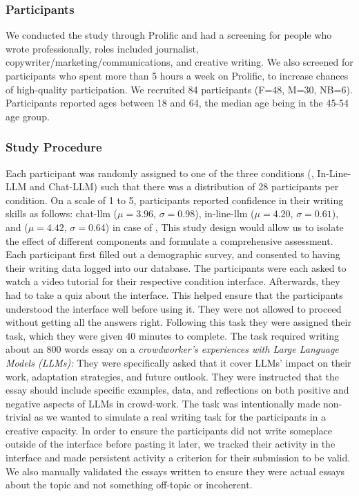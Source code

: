 \subsubsection{Participants}
We conducted the study through Prolific and had a screening for people who wrote professionally, roles included journalist, copywriter/marketing/communications, and creative writing. We also screened for participants who spent more than 5 hours a week on Prolific, to increase chances of high-quality participation. We recruited 84 participants (F=48, M=30, NB=6). Participants reported ages between 18 and 64, the median age being in the 45-54 age group. 

\subsubsection{Study Procedure}
Each participant was randomly assigned to one of the three conditions (\system, In-Line-LLM and Chat-LLM) such that there was a distribution of 28 participants per condition.  On a scale of 1 to 5, participants reported confidence in their writing skills as follows: chat-llm ($\mu = 3.96$, $\sigma = 0.98$), in-line-llm ($\mu = 4.20$, $\sigma = 0.61$), and \system ($\mu = 4.42$, $\sigma = 0.64$) in case of \system, This study design would allow us to isolate the effect of different components and formulate a comprehensive assessment. Each participant first filled out a demographic survey, and consented to having their writing data logged into our database. The participants were each asked to watch a video tutorial for their respective condition interface. Afterwards,  they had to take a quiz about the interface. This helped ensure that the participants understood the interface well before using it. They were not allowed to proceed without getting all the answers right. Following this task they were assigned their task, which they were given 40 minutes to complete. The task required writing about an 800 words essay on a \textit{crowdworker's experiences with Large Language Models (LLMs):} They were specifically asked that it cover LLMs' impact on their work, adaptation strategies, and future outlook. They were instructed that the essay should include specific examples, data, and reflections on both positive and negative aspects of LLMs in crowd-work. The task was intentionally made non-trivial as we wanted to simulate a real writing task for the participants in a creative capacity. In order to ensure the participants did not write someplace outside of the interface before pasting it later, we tracked their activity in the interface and made persistent activity a criterion for their submission to be valid. We also manually validated the essays written to ensure they were actual essays about the topic and not something off-topic or incoherent.

